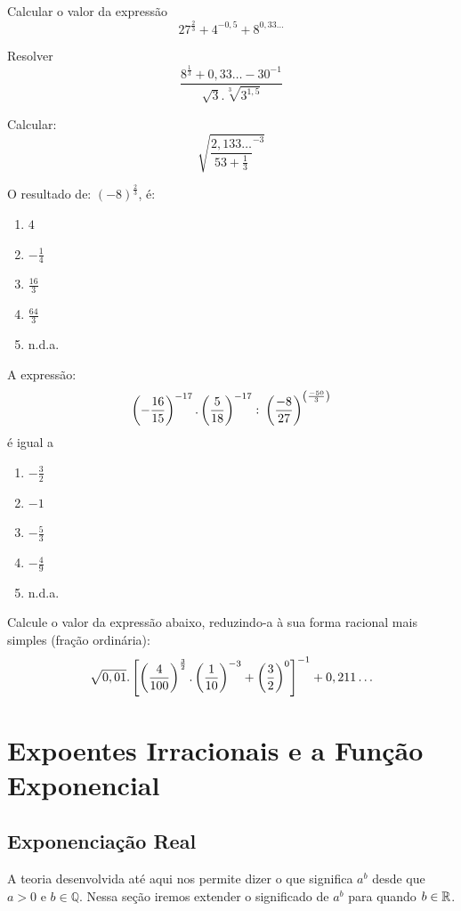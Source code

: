 \begin{exer}[EsPCEx] Calcular o valor da expressão $$27^\frac{2}{3} + 4^{-0,5}+8^{0,33\ldots}$$
\end{exer}
\begin{exer}[CN] Resolver $$\frac{8^\frac{1}{3}+0,33\ldots-30^{-1}}{\sqrt{3}.\sqrt[3]{3^{1,5}}} $$
\end{exer}
\begin{exer}[CN] Calcular: $$\sqrt{\frac{2,133\ldots}{53+\frac{1}{3}}^{-3}} $$
\end{exer}
\begin{exer}[EsPCEx]O resultado de: $(-8)^\frac{2}{3}$, é:
\begin{enumerate}[A ( )]
\item $4$
\item $-\frac{1}{4}$
\item $\frac{16}{3}$
\item $\frac{64}{3}$
\item n.d.a.
\end{enumerate}
\end{exer}
\begin{exer}[EsPCEx]A expressão: $$\left( -\frac{16}{15} \right)^{-17}.\left ( \frac{5}{18} \right)^{-17} \colon \left ( \frac{-8}{27} \right)^{\left ( \frac{-50}{3} \right)}$$é igual a 
\begin{enumerate}[A ( )]
\item $-\frac{3}{2}$
\item $-1$
\item $-\frac{5}{3}$
\item $-\frac{4}{9}$
\item n.d.a.
\end{enumerate}

\end{exer}
\begin{exer}[EsPCEx]Calcule o valor da expressão abaixo, reduzindo-a à sua forma racional mais simples (fração ordinária):
$$\sqrt{0,01}. \left[ \left ( \frac{4}{100} \right)^\frac{3}{2}.\left ( \frac{1}{10} \right)^{-3}+\left ( \frac{3}{2} \right)^0 \right ]^{-1} +0,211\ldots $$
\end{exer}
\terminaexer
\newpage
\section{Expoentes Irracionais e a Função Exponencial}
\subsection{Exponenciação Real}
A teoria desenvolvida até aqui nos permite dizer o que significa $a^b$ desde que $a>0$ e $b\in\mathbb{Q}$. Nessa seção iremos extender o significado de $a^b$ para quando $b \in \mathbb{R}$. 

